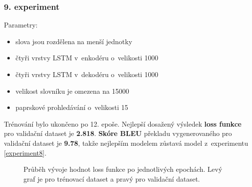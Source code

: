 \subsubsection{9. experiment}\label{experiment9}
Parametry:
\begin{itemize}
  \item slova jsou rozdělena na menší jednotky
  \item čtyři vrstvy LSTM v~enkodéru o~velikosti 1000
  \item čtyři vrstvy LSTM v~dekodéru o~velikosti 1000
  \item velikost slovníku je omezena na 15000
  \item paprskové prohledávání o~velikosti 15
\end{itemize}

Trénování bylo ukončeno po 12. epoše. Nejlepší dosažený výsledek \textbf{loss funkce} pro validační dataset je \textbf{2.818}. \textbf{Skóre BLEU} překladu vygenerovaného pro validační dataset je \textbf{9.78}, takže nejlepším modelem zůstavá model z~experimentu \ref{experiment8}.

\begin{figure}[H]
    \begin{center}
    \end{center}
	\caption{Průběh vývoje hodnot loss funkce po jednotlivých epochách. Levý graf je pro trénovací dataset a pravý pro validační dataset.}
\end{figure}

